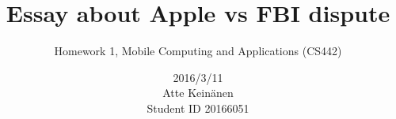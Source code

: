 \documentclass[twoside]{article}
\title{Essay about Apple vs FBI dispute}
\subtitle{Homework 1, Mobile Computing and Applications (CS442)}
\author{2016/3/11\protect\\Atte Keinänen\protect\\Student ID 20166051}
\date{}
\begin{document}
\maketitle{}
\cite{isntatsake}
\cite{mustunlock}
\cite{appletellscourt}
\cite{thereareotherways}
\printbibliography
\end{document}
